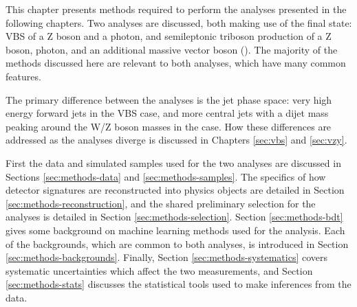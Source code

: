 
This chapter presents methods required to perform the analyses presented in the
following chapters. Two analyses are discussed, both making use of the \Zyjj
final state: \acs{VBS} of a Z boson and a photon, and semileptonic triboson
production of a Z boson, photon, and an additional massive vector boson (\VZy).
The majority of the methods discussed here are relevant to both analyses, which
have many common features. 

The primary difference between the analyses is the jet phase space:
very high energy forward jets in the \ac{VBS} \Zy case, and more central jets
with a dijet mass peaking around the W/Z boson masses in the \VZy case.
How these differences are addressed as the analyses diverge is discussed in
Chapters \ref{sec:vbs} and \ref{sec:vzy}.

First the data and simulated samples used for the two analyses are discussed in
Sections \ref{sec:methods-data} and \ref{sec:methods-samples}. The specifics of
how detector signatures are reconstructed into physics objects are detailed in
Section \ref{sec:methods-reconstruction}, and the shared preliminary selection
for the analyses is detailed in Section \ref{sec:methods-selection}.  Section
\ref{sec:methods-bdt} gives some background on machine learning methods used for
the \VZy analysis. Each of the backgrounds, which are common to both analyses,
is introduced in Section \ref{sec:methods-backgrounds}. Finally, Section
\ref{sec:methods-systematics} covers systematic uncertainties which affect the
two measurements, and Section \ref{sec:methods-stats} discusses the statistical
tools used to make inferences from the data.
